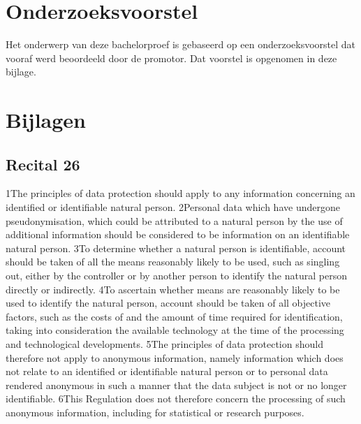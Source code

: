 \documentclass{bachproef-tin}
\begin{document}
%
%




\appendix
\renewcommand{\chaptername}{Appendix}


\chapter{Onderzoeksvoorstel}

Het onderwerp van deze bachelorproef is gebaseerd op een onderzoeksvoorstel dat vooraf werd beoordeeld door de promotor. Dat voorstel is opgenomen in deze bijlage.



%
\chapter{Bijlagen}
\section{Recital 26}
\textcite{Europe2016}
1The principles of data protection should apply to any information concerning an identified or identifiable natural person. 2Personal data which have undergone pseudonymisation, which could be attributed to a natural person by the use of additional information should be considered to be information on an identifiable natural person. 3To determine whether a natural person is identifiable, account should be taken of all the means reasonably likely to be used, such as singling out, either by the controller or by another person to identify the natural person directly or indirectly. 4To ascertain whether means are reasonably likely to be used to identify the natural person, account should be taken of all objective factors, such as the costs of and the amount of time required for identification, taking into consideration the available technology at the time of the processing and technological developments. 5The principles of data protection should therefore not apply to anonymous information, namely information which does not relate to an identified or identifiable natural person or to personal data rendered anonymous in such a manner that the data subject is not or no longer identifiable. 6This Regulation does not therefore concern the processing of such anonymous information, including for statistical or research purposes.
\end{document}
